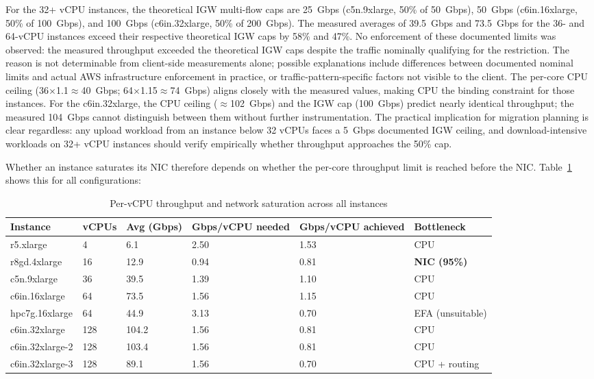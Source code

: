 For the 32+ vCPU instances, the theoretical IGW multi-flow caps are 25~Gbps (c5n.9xlarge, 50\% of 50~Gbps), 50~Gbps (c6in.16xlarge, 50\% of 100~Gbps), and 100~Gbps (c6in.32xlarge, 50\% of 200~Gbps). The measured averages of 39.5~Gbps and 73.5~Gbps for the 36- and 64-vCPU instances exceed their respective theoretical IGW caps by 58\% and 47\%. No enforcement of these documented limits was observed: the measured throughput exceeded the theoretical IGW caps despite the traffic nominally qualifying for the restriction. The reason is not determinable from client-side measurements alone; possible explanations include differences between documented nominal limits and actual AWS infrastructure enforcement in practice, or traffic-pattern-specific factors not visible to the client. The per-core CPU ceiling (36$\times$1.1$\approx$40~Gbps; 64$\times$1.15$\approx$74~Gbps) aligns closely with the measured values, making CPU the binding constraint for those instances. For the c6in.32xlarge, the CPU ceiling ($\approx$102~Gbps) and the IGW cap (100~Gbps) predict nearly identical throughput; the measured 104~Gbps cannot distinguish between them without further instrumentation. The practical implication for migration planning is clear regardless: any upload workload from an instance below 32 vCPUs faces a 5~Gbps documented IGW ceiling, and download-intensive workloads on 32+ vCPU instances should verify empirically whether throughput approaches the 50\% cap.


Whether an instance saturates its NIC therefore depends on whether the per-core throughput limit is reached before the NIC. Table~\ref{tab:throughput-per-vcpu} shows this for all configurations:

\begin{table}[H]
\centering
\caption{Per-vCPU throughput and network saturation across all instances}
\label{tab:throughput-per-vcpu}
\small
\begin{tabular}{p{2.8cm}p{1cm}p{1.8cm}p{1.8cm}p{1.8cm}p{3cm}}
\hline
\textbf{Instance} & \textbf{vCPUs} & \textbf{Avg (Gbps)} & \textbf{Gbps/vCPU needed} & \textbf{Gbps/vCPU achieved} & \textbf{Bottleneck} \\
\hline
r5.xlarge          & 4   & 6.1   & 2.50 & 1.53 & CPU \\
r8gd.4xlarge       & 16  & 12.9  & 0.94 & 0.81 & \textbf{NIC (95\%)} \\
c5n.9xlarge        & 36  & 39.5  & 1.39 & 1.10 & CPU \\
c6in.16xlarge      & 64  & 73.5  & 1.56 & 1.15 & CPU \\
hpc7g.16xlarge     & 64  & 44.9  & 3.13 & 0.70 & EFA (unsuitable) \\
c6in.32xlarge      & 128 & 104.2 & 1.56 & 0.81 & CPU \\
c6in.32xlarge-2    & 128 & 103.4 & 1.56 & 0.81 & CPU \\
c6in.32xlarge-3    & 128 & 89.1  & 1.56 & 0.70 & CPU + routing \\
\hline
\end{tabular}
\end{table}

